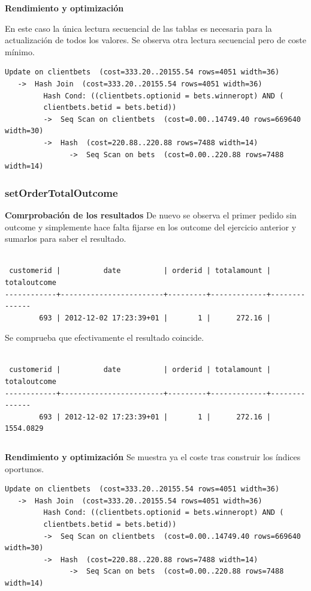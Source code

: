 \documentclass{article}
\begin{document}
$$\;$$

\textbf{Rendimiento y optimización}

En este caso la única lectura secuencial de las tablas es necesaria para la actualización de todos los valores. Se observa otra lectura secuencial pero de coste mínimo.

\begin{lstlisting}[style=sql]
 Update on clientbets  (cost=333.20..20155.54 rows=4051 width=36)
   ->  Hash Join  (cost=333.20..20155.54 rows=4051 width=36)
         Hash Cond: ((clientbets.optionid = bets.winneropt) AND (
         clientbets.betid = bets.betid))
         ->  Seq Scan on clientbets  (cost=0.00..14749.40 rows=669640 width=30)
         ->  Hash  (cost=220.88..220.88 rows=7488 width=14)
               ->  Seq Scan on bets  (cost=0.00..220.88 rows=7488 width=14)
\end{lstlisting}

\subsubsection{setOrderTotalOutcome}

\textbf{Comrprobación de los resultados}
De nuevo se observa el primer pedido sin outcome y simplemente hace falta fijarse en los outcome del ejercicio anterior y sumarlos para saber el resultado.
\begin{lstlisting}[style=sql]

 customerid |          date          | orderid | totalamount | totaloutcome
------------+------------------------+---------+-------------+--------------
        693 | 2012-12-02 17:23:39+01 |       1 |      272.16 |
\end{lstlisting}
Se comprueba que efectivamente el resultado coincide.
\begin{lstlisting}[style=sql]

 customerid |          date          | orderid | totalamount | totaloutcome
------------+------------------------+---------+-------------+--------------
        693 | 2012-12-02 17:23:39+01 |       1 |      272.16 |    1554.0829
\end{lstlisting}

$$\;$$

\textbf{Rendimiento y optimización}
Se muestra ya el coste tras construir los índices oportunos.
\begin{lstlisting}[style=sql]
 Update on clientbets  (cost=333.20..20155.54 rows=4051 width=36)
   ->  Hash Join  (cost=333.20..20155.54 rows=4051 width=36)
         Hash Cond: ((clientbets.optionid = bets.winneropt) AND (
         clientbets.betid = bets.betid))
         ->  Seq Scan on clientbets  (cost=0.00..14749.40 rows=669640 width=30)
         ->  Hash  (cost=220.88..220.88 rows=7488 width=14)
               ->  Seq Scan on bets  (cost=0.00..220.88 rows=7488 width=14)
\end{lstlisting}
\end{document}
